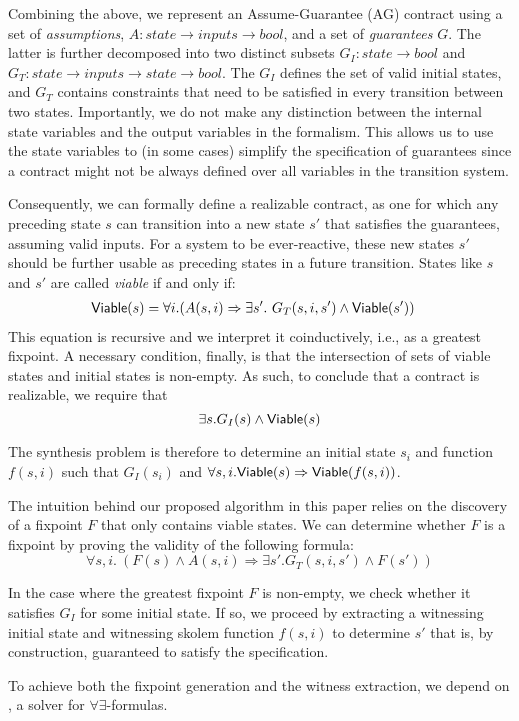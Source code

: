 Combining the above, we represent an Assume-Guarantee (AG) contract using a set
of \emph{assumptions}, $A: state \rightarrow inputs \rightarrow bool$,
and a set of \emph{guarantees} $G$. The latter is further decomposed into two
distinct subsets $G_I: state \rightarrow bool$ and $G_T: state \rightarrow
inputs \rightarrow state \rightarrow bool$. The $G_I$ defines the set of valid
initial states, and $G_T$ contains constraints that need to be satisfied in
every transition between two states. Importantly, we
do not make any distinction between the internal state variables and the output variables in the
formalism. This allows us to use the state variables to (in some cases)
simplify the specification of guarantees since a contract
might not be always defined over all variables in the transition system.

Consequently, we can formally define a realizable contract, as one for which any
preceding state $s$ can  transition into a new state $s'$ that satisfies
the guarantees, assuming valid inputs. For a system to be ever-reactive, these
new states $s'$ should be further usable as preceding states in a future
transition. States like $s$ and $s'$ are called \textit{viable} if
and only if:
\begin{align}
\begin{split}
  {\mathsf {Viable}}(s) &=
  \forall i. (A(s, i) \Rightarrow \exists s'.~ G_T(s, i,s')
\land {\mathsf {Viable}}(s'))
\label{eq:viable}
\end{split}
\end{align}
This equation is recursive and we interpret it coinductively, i.e., as a
greatest fixpoint.
A necessary condition, finally, is that the intersection of sets of viable states
and initial states is non-empty. As such, to conclude that a contract
is realizable, we require that
\begin{equation}
\exists s. G_I(s) \land {\mathsf {Viable}}(s)
\label{eq:nonempty}
\end{equation}

\noindent The synthesis problem is therefore to determine an initial state $s_i$ and function $f(s, i)$ such that $G_I(s_i)$ and $\forall s, i . {\mathsf {Viable}}(s) \Rightarrow {\mathsf {Viable}}(f(s, i))$.

The intuition behind our proposed algorithm in this paper relies on the
discovery of a fixpoint $F$ that only contains viable states.  We can determine whether $F$ is a fixpoint by proving the validity of the following formula:
\[
\forall s,i. \ (F(s) \land A(s,i) \Rightarrow \exists s'.G_{T}(s,i,s') \land F(s'))
\]

\noindent In the case where the greatest fixpoint $F$ is non-empty, we check whether it satisfies $G_{I}$ for some initial state.  If so, we proceed by extracting a witnessing initial state and witnessing skolem function $f(s, i)$ to determine $s'$ that is, by construction, guaranteed to satisfy the specification.

To achieve both the fixpoint generation and the witness extraction, we depend on \aeval, a solver for $\forall\exists$-formulas.


